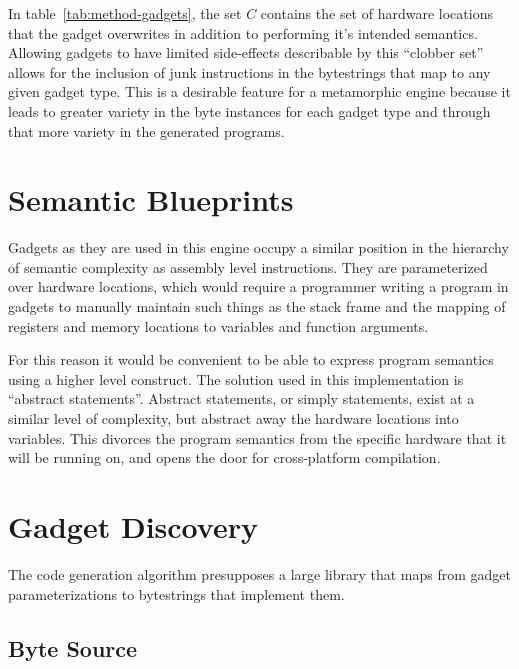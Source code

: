     In table~\ref{tab:method-gadgets}, the set $C$ contains the set of hardware
    locations that the gadget overwrites in addition to performing it's intended
    semantics. Allowing gadgets to have limited side-effects describable by this
    ``clobber set'' allows for the inclusion of junk instructions in the
    bytestrings that map to any given gadget type. This is a desirable feature
    for a metamorphic engine because it leads to greater variety in the byte
    instances for each gadget type and through that more variety in the
    generated programs.  


    \section{Semantic Blueprints}

    Gadgets as they are used in this engine occupy a similar position in the
    hierarchy of semantic complexity as assembly level instructions. They are
    parameterized over hardware locations, which would require a programmer
    writing a program in gadgets to manually maintain such things as the stack
    frame and the mapping of registers and memory locations to variables and
    function arguments.

    For this reason it would be convenient to be able to express program
    semantics using a higher level construct. The solution used in this
    implementation is ``abstract statements''. Abstract statements, or simply
    statements, exist at a similar level of complexity, but abstract away the
    hardware locations into variables. This divorces the program semantics from
    the specific hardware that it will be running on, and opens the door for
    cross-platform compilation.


    \section{Gadget Discovery}

    The code generation algorithm presupposes a large library that maps from
    gadget parameterizations to bytestrings that implement them.

    \subsection{Byte Source}

